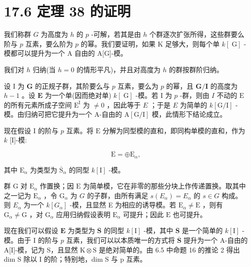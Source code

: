 \documentclass[10pt]{article}
\begin{document}
\section*{17.6 定理 38 的证明}

我们称群 \(G\) 为高度为 \(h\) 的 \(p\) -可解，若其是由 \(h\) 个群逐次扩张所得，这些群要么阶与 \(p\) 互素，要么阶为 \(p\) 的幂。我们要证明，如果 \(\mathrm{K}\) 足够大，则每个单 \(k\left\lbrack  \mathrm{\;G}\right\rbrack\) -模都可以提升为一个 A 自由的 A[G]-模。

我们对 \(h\) 归纳(当 \(h = 0\) 的情形平凡)，并且对高度为 \(h\) 的群按群阶归纳。

设 I 为 \(\mathbf{G}\) 的正规子群，其阶要么与 \(p\) 互素，要么为 \(p\) 的幂，且 \(\mathbf{G}/\mathbf{I}\) 的高度为 \(h - 1\) 。设 \(\mathbf{E}\) 为一个单(因而绝对单) \(k\left\lbrack  \mathrm{\;G}\right\rbrack\) -模。若 I 为 \(p\) -群，则由 \(I\) 不动的 \(\mathrm{E}\) 的所有元素所成子空间 \({\mathrm{E}}^{\mathrm{I}}\) 为 \(\neq  0\) ，因此等于 \(E\) ；于是 \(E\) 为简单的 \(k\left\lbrack  {\mathrm{G}/\mathrm{I}}\right\rbrack\) -模。由归纳可把它提升为一个 A-自由的 \(\mathrm{A}\left\lbrack  {\mathrm{G}/\mathrm{I}}\right\rbrack\) 模，此情形下结论成立。

现在假设 I 的阶与 \(p\) 互素。将 \(\mathrm{E}\) 分解为同型模的直和，即同构单模的直和，作为 \(k\) [I]-模:

\[
\mathrm{E} =  \oplus  {\mathrm{E}}_{\alpha },
\]

其中 \({\mathrm{E}}_{\alpha }\) 为类型为 \({\overline{\mathrm{S}}}_{\alpha }\) 的同型 \(k\left\lbrack  \mathrm{I}\right\rbrack\) -模。

群 \(\mathrm{G}\) 对 \({\mathrm{E}}_{\alpha }\) 作置换；因 \(\mathrm{E}\) 为简单模，它在非零的那些分块上作传递置换。取其中之一记为 \({\mathrm{E}}_{\alpha }\) ，令 \({\mathrm{G}}_{\alpha }\) 为 \(G\) 的子群，由所有满足 \(s\left( {E}_{\alpha }\right)  = {E}_{\alpha }\) 的 \(s \in  G\) 构成。则 \({E}_{\alpha }\) 为一个 \(k\left\lbrack  {G}_{\alpha }\right\rbrack\) -模，且显然 E 为相应的诱导模。若 \({\mathrm{E}}_{\alpha } \neq  \mathrm{E}\) ，则有 \({\mathrm{G}}_{\alpha } \neq  \mathrm{G}\) ，对 \({\mathrm{G}}_{\alpha }\) 应用归纳假设表明 \({\mathrm{E}}_{\alpha }\) 可提升；因此 \(\mathrm{E}\) 也可提升。

现在我们可以假设 \(\mathbf{E}\) 为类型为 \(\overline{\mathbf{S}}\) 的同型 \(k\left\lbrack  \mathrm{I}\right\rbrack\) -模，其中 \(\overline{\mathbf{S}}\) 是一个简单的 \(k\left\lbrack  \mathrm{I}\right\rbrack\) -模。由于 \(\mathrm{I}\) 的阶与 \(p\) 互素，我们可以以本质唯一的方式将 \(\overline{\mathbf{S}}\) 提升为一个 A-自由的 A[I]-模，记为 S，且显然 \(\mathrm{K} \otimes  \mathrm{S}\) 是绝对简单的。由 6.5 中命题 16 的推论 2 得出 dim S 除以 I 的阶；特别地，dim S 与 p 互素。
\end{document}
